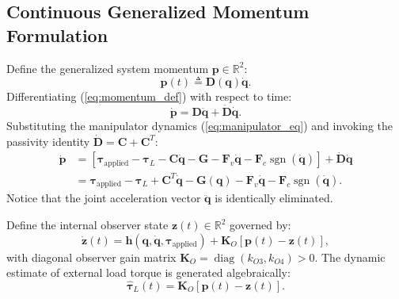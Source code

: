 \documentclass[journal]{IEEEtran}
\begin{document}
\subsection{Continuous Generalized Momentum Formulation}
Define the generalized system momentum $\bm{p} \in \mathbb{R}^2$:
\begin{equation}
\bm{p}(t) \triangleq \bm{D}(\bm{q})\dot{\bm{q}}.
\label{eq:momentum_def}
\end{equation}
Differentiating (\ref{eq:momentum_def}) with respect to time:
\begin{equation}
\dot{\bm{p}} = \bm{D}\ddot{\bm{q}} + \dot{\bm{D}}\dot{\bm{q}}.
\end{equation}
Substituting the manipulator dynamics (\ref{eq:manipulator_eq}) and invoking the passivity identity $\dot{\bm{D}} = \bm{C} + \bm{C}^T$:
\begin{align}
\dot{\bm{p}} &= \left[\bm{\tau}_{\mathrm{applied}} - \bm{\tau}_L - \bm{C}\dot{\bm{q}} - \bm{G} - \bm{F}_v \dot{\bm{q}} - \bm{F}_c \operatorname{sgn}(\dot{\bm{q}})\right] + \dot{\bm{D}}\dot{\bm{q}} \nonumber \\
&= \bm{\tau}_{\mathrm{applied}} - \bm{\tau}_L + \bm{C}^T \dot{\bm{q}} - \bm{G}(\bm{q}) - \bm{F}_v \dot{\bm{q}} - \bm{F}_c \operatorname{sgn}(\dot{\bm{q}}).
\label{eq:p_dot}
\end{align}
Notice that the joint acceleration vector $\ddot{\bm{q}}$ is identically eliminated.

Define the internal observer state $\bm{z}(t) \in \mathbb{R}^2$ governed by:
\begin{equation}
\dot{\bm{z}}(t) = \bm{h}(\bm{q},\dot{\bm{q}},\bm{\tau}_{\mathrm{applied}}) + \bm{K}_O [\bm{p}(t) - \bm{z}(t)],
\label{eq:obs_dyn}
\end{equation}
with diagonal observer gain matrix $\bm{K}_O = \operatorname{diag}(k_{O3}, k_{O4}) > 0$. The dynamic estimate of external load torque is generated algebraically:
\begin{equation}
\hat{\bm{\tau}}_L(t) = \bm{K}_O [\bm{p}(t) - \bm{z}(t)].
\label{eq:obs_output}
\end{equation}
\end{document}

